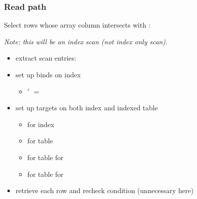 \begin{frame}
  \frametitle{Read path}
  Select rows whose array column intersects with :

  \pause

  \emph{Note: this will be an index scan (not index only scan).}
  \pause

  \begin{itemize}
    \item extract scan entries: 
      \pause
    \item set up binds on index
      \begin{itemize}
        \item {}$'$ $=$ 
      \end{itemize}
      \pause
    \item set up targets on both index and indexed table
      \begin{itemize}
        \item {} for index
          \pause
        \item {} for table
          \pause
        \item {} for table for 
          \pause
        \item {} for table for 
      \end{itemize}
      \pause
    \item retrieve each row and recheck condition (unnecessary here)
  \end{itemize}
\end{frame}

